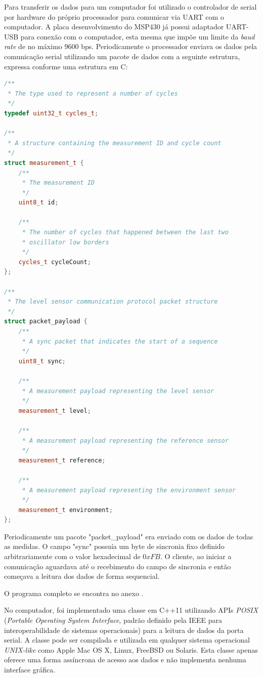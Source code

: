 \documentclass[a4paper]{instrumentacao}
\begin{document}
Para transferir os dados para um computador foi utilizado o controlador de serial por hardware do próprio processador para comunicar via UART com o computador. A placa desenvolvimento do MSP430 já possui adaptador UART-USB para conexão com o computador, esta mesma que impõe um limite da \textit{baud rate} de no máximo 9600 bps. Periodicamente o processador enviava os dados pela comunicação serial utilizando um pacote de dados com a seguinte estrutura, expressa conforme uma estrutura em C:

\begin{lstlisting}[caption=Estrutura dos pacotes de conteúdo enviados pela linha de comunicação serial, language=C++, directivestyle={\color{black}} emph={int,char,double,float,unsigned,uint8_t}, emphstyle={\color{blue}}]
/**
 * The type used to represent a number of cycles
 */
typedef uint32_t cycles_t;

/**
 * A structure containing the measurement ID and cycle count
 */
struct measurement_t {
    /**
     * The measurement ID
     */
    uint8_t id;

    /**
     * The number of cycles that happened between the last two 
     * oscillator low borders
     */
    cycles_t cycleCount;
};

/**
 * The level sensor communication protocol packet structure
 */
struct packet_payload {
    /**
     * A sync packet that indicates the start of a sequence
     */
    uint8_t sync;

    /**
     * A measurement payload representing the level sensor
     */
    measurement_t level;

    /**
     * A measurement payload representing the reference sensor
     */
	measurement_t reference;

    /**
     * A measurement payload representing the environment sensor
     */
    measurement_t environment;
};
\end{lstlisting}

Periodicamente um pacote "packet\_payload" era enviado com os dados de todas as medidas. O campo "sync" possuía um byte de sincronia fixo definido arbitrariamente com o valor hexadecimal de $0xFB$. O cliente, ao iniciar a comunicação aguardava até o recebimento do campo de sincronia e então começava a leitura dos dados de forma sequencial.

O programa completo se encontra no anexo .

No computador, foi implementado uma classe em C++11 utilizando APIs \textit{POSIX} (\textit{Portable Operating System Interface}, padrão definido pela IEEE para interoperabilidade de sistemas operacionais) para a leitura de dados da porta serial. A classe pode ser compilada e utilizada em qualquer sistema operacional \textit{UNIX-like} como Apple Mac OS X, Linux, FreeBSD ou Solaris. Esta classe apenas oferece uma forma assíncrona de acesso aos dados e não implementa nenhuma interface gráfica.
\end{document}
